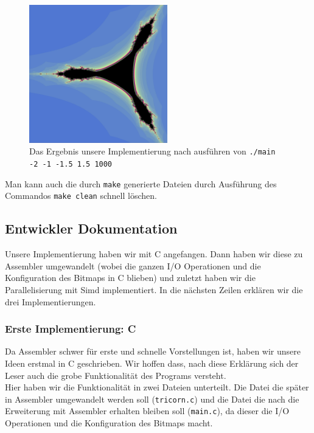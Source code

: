 \documentclass[course=erap]{aspdoc}
\begin{document}
\begin{figure}
    \centering
    \includegraphics[width=60mm]{img/tricorn_result.jpg}
    \caption{Das Ergebnis unsere Implementierung nach ausf\"uhren von \lstinline{./main -2 -1 -1.5 1.5 1000}}
    \label{fig:tricorn_result}
\end{figure}

Man kann auch die durch \lstinline{make} generierte Dateien durch Ausf\"uhrung des Commandos \lstinline{make clean} schnell l\"oschen. 

\subsection{Entwickler Dokumentation}\label{sub:entwickler}

Unsere Implementierung haben wir mit C angefangen. Dann haben wir diese zu Assembler umgewandelt (wobei die ganzen I/O Operationen und die Konfiguration des Bitmaps in C blieben) und zuletzt haben wir die Parallelisierung mit Simd implementiert. In die n\"achsten Zeilen erkl\"aren wir die drei Implementierungen. 

\subsubsection{Erste Implementierung: C}

Da Assembler schwer f\"ur erste und schnelle Vorstellungen ist, haben wir unsere Ideen erstmal in C geschrieben. Wir hoffen dass, nach diese Erkl\"arung sich der Leser auch die grobe Funktionalit\"at des Programs versteht. \\

Hier haben wir die Funktionalit\"at in zwei Dateien unterteilt. Die Datei die sp\"ater in Assembler umgewandelt werden soll (\lstinline{tricorn.c}) und die Datei die nach die Erweiterung mit Assembler erhalten bleiben soll (\lstinline{main.c}), da dieser die I/O Operationen und die Konfiguration des Bitmaps macht.
\end{document}

